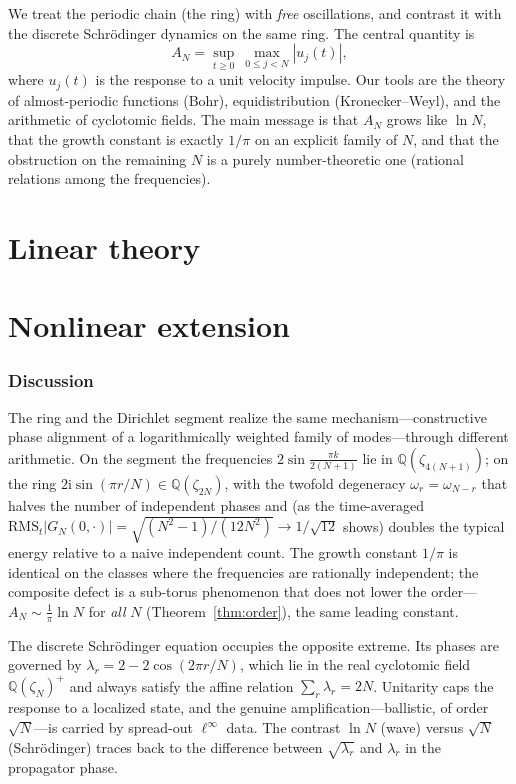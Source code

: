 \documentclass[11pt,reqno]{amsart}
\theoremstyle{plain}
\theoremstyle{definition}
\newcommand{\Q}{\mathbb{Q}}
\begin{document}
We treat the periodic chain (the ring) with \emph{free} oscillations, and contrast it with the
discrete Schr\"odinger dynamics on the same ring. The central quantity is
\[
  A_N=\sup_{t\ge0}\ \max_{0\le j<N}|u_j(t)|,
\]
where $u_j(t)$ is the response to a unit velocity impulse. Our tools are the theory of
almost-periodic functions (Bohr), equidistribution (Kronecker--Weyl), and the arithmetic of
cyclotomic fields. The main message is that $A_N$ grows like $\ln N$, that the growth constant is
exactly $1/\pi$ on an explicit family of $N$, and that the obstruction on the remaining $N$ is a
purely number-theoretic one (rational relations among the frequencies).

\part{Linear theory}



\part{Nonlinear extension}



\section{Discussion}

The ring and the Dirichlet segment realize the same mechanism---constructive phase alignment of a
logarithmically weighted family of modes---through different arithmetic. On the segment the
frequencies $2\sin\frac{\pi k}{2(N+1)}$ lie in $\Q(\zeta_{4(N+1)})$; on the ring $2\mathrm i\sin(\pi r/N)\in\Q(\zeta_{2N})$,
with the twofold degeneracy $\omega_r=\omega_{N-r}$ that halves the number of independent phases and
(as the time-averaged $\mathrm{RMS}_t|G_N(0,\cdot)|=\sqrt{(N^2-1)/(12N^2)}\to1/\sqrt{12}$ shows) doubles the typical energy
relative to a naive independent count. The growth constant $1/\pi$ is identical on the classes where
the frequencies are rationally independent; the composite defect is a sub-torus phenomenon that does not
lower the order---$A_N\sim\tfrac1\pi\ln N$ for \emph{all} $N$ (Theorem~\ref{thm:order}), the same leading
constant.

The discrete Schr\"odinger equation occupies the opposite extreme. Its phases are governed by
$\lambda_r=2-2\cos(2\pi r/N)$, which lie in the real cyclotomic field $\Q(\zeta_N)^+$ and always
satisfy the affine relation $\sum_r\lambda_r=2N$. Unitarity caps the response to a localized state,
and the genuine amplification---ballistic, of order $\sqrt N$---is carried by spread-out
$\ell^\infty$ data. The contrast $\ln N$ (wave) versus $\sqrt N$ (Schr\"odinger) traces back to the
difference between $\sqrt{\lambda_r}$ and $\lambda_r$ in the propagator phase.
\end{document}

